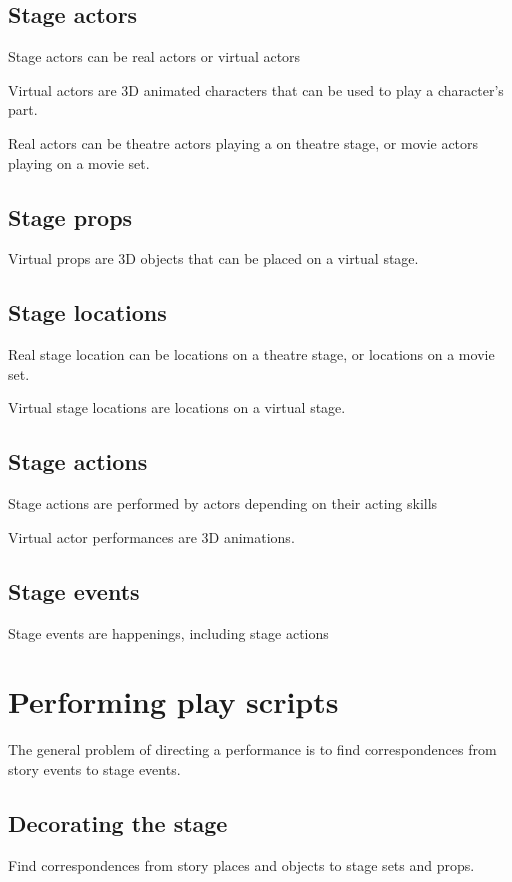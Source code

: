 \documentclass[a4paper,UKenglish]{oasics}
\begin{document}
\subsection{Stage actors}
Stage actors can be real actors or virtual actors

Virtual actors are 3D animated characters that can be used to play a character's part.

Real actors can be theatre actors playing a on theatre stage, 
or movie actors playing on a movie set.

\subsection{Stage props}
Virtual props are 3D objects that can be placed on a  virtual stage.

\subsection{Stage locations}
Real stage location can be locations on a theatre stage, or locations on a movie set.

Virtual stage locations are locations on a virtual stage.


\subsection{Stage actions}
Stage actions are performed by actors depending on their acting skills

Virtual actor performances are 3D animations.

\subsection{Stage events}
Stage events  are happenings, including stage actions  






\section{Performing play scripts}
The general problem of directing a performance is to find correspondences from 
story events to stage events.

\subsection{Decorating the stage}
Find correspondences from story places and objects to stage sets and props.
\end{document}
